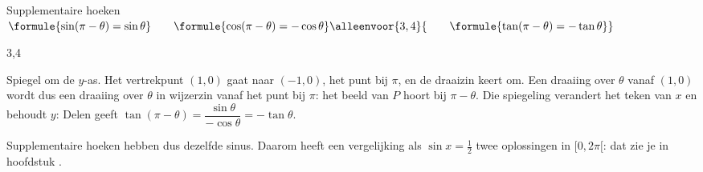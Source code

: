 \begin{theorie}
\begin{stelling}{Supplementaire hoeken}
\qquad $\formule{\sin(\pi - \theta) = \sin\theta} \qquad \formule{\cos(\pi - \theta) = -\cos\theta}\alleenvoor{3,4}{ \qquad \formule{\tan(\pi - \theta) = -\tan\theta}}$
\end{stelling}
\begin{alleenvoor}{3,4}
\begin{bewijs}
Spiegel om de $y$-as. Het vertrekpunt $(1, 0)$ gaat naar $(-1, 0)$, het punt bij $\pi$, en de draaizin keert om. Een draaiing over $\theta$ vanaf $(1, 0)$ wordt dus een draaiing over $\theta$ in wijzerzin vanaf het punt bij $\pi$: het beeld van $P$ hoort bij $\pi - \theta$. Die spiegeling verandert het teken van $x$ en behoudt $y$:
Delen geeft $\tan(\pi - \theta) = \dfrac{\sin\theta}{-\cos\theta} = -\tan\theta$.
\end{bewijs}
\end{alleenvoor}
\end{theorie}

Supplementaire hoeken hebben dus dezelfde sinus. Daarom heeft een vergelijking als $\sin x = \frac12$ twee oplossingen in $[0, 2\pi[$: dat zie je in hoofdstuk .


